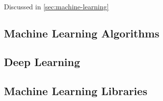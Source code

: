\lipsum \\
Discussed in \ref{sec:machine-learning}


\subsection{Machine Learning Algorithms}
\label{subsec:ml-algorithms}

\lipsum


\subsection{Deep Learning}
\label{subsec:deep-learning}

\lipsum


\subsection{Machine Learning Libraries}
\label{subsec:ml-libraries}

\lipsum